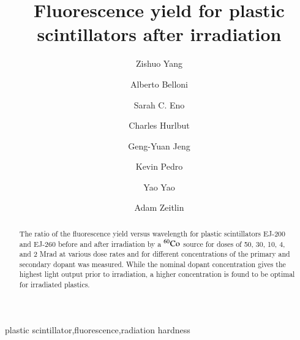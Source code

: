 \documentclass[review]{elsarticle}
\begin{document}
\begin{frontmatter}

\title{Fluorescence yield for plastic scintillators after irradiation }


\author[umd]{Zishuo Yang}
\author[umd]{Alberto Belloni}
\author[umd]{Sarah C. Eno}

\author[eljen]{Charles Hurlbut}
\author[umd]{Geng-Yuan Jeng}
\author[fnal]{Kevin Pedro}
\author[umd]{Yao Yao}
\author[umd]{Adam Zeitlin}



\address[umd]{Dept. Physics, U. Maryland, College Park MD 30742 USA}
\address[eljen]{Eljen Technology, 1300 W. Broadway, Sweetwater, TX 79556 USA}
\address[fnal]{Fermi National Accelerator Laboratory, Batavia, IL, USA}

\begin{abstract}
The ratio of the fluorescence yield versus wavelength for plastic scintillators EJ-200 and EJ-260 before and after irradiation by a $\rm {^{60}Co}$ source for doses of 50, 30, 10, 4, and 2 Mrad at various dose rates and for different concentrations of the primary and secondary dopant was measured.  While the nominal dopant concentration gives the highest light output prior to irradiation, a higher concentration is found to be optimal for irradiated plastics.
\end{abstract}

\begin{keyword}
plastic scintillator\sep fluorescence\sep radiation hardness
\end{keyword}

\end{frontmatter}

\linenumbers
\end{document}

